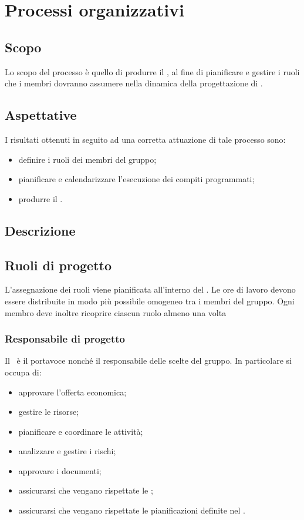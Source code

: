 \documentclass[../NormeDiProgetto.tex]{subfiles}
\begin{document}
	\section{Processi organizzativi}
		\subsection{Scopo}
			Lo scopo del processo è quello di produrre il \pianodiprogettoRR, al fine di pianificare e gestire i ruoli che i membri dovranno assumere nella dinamica della progettazione di \progetto.
		\subsection{Aspettative}
			I risultati ottenuti in seguito ad una corretta attuazione di tale processo sono:
			\begin{itemize}
				\item definire i ruoli dei membri del gruppo;
				\item pianificare e calendarizzare l'esecuzione dei compiti programmati;
				\item produrre il \pianodiprogetto.
			\end{itemize}				
		\subsection{Descrizione}
		\subsection{Ruoli di progetto}
			L'assegnazione dei ruoli viene pianificata all'interno del \pianodiprogetto. Le ore di lavoro devono essere distribuite in modo più possibile omogeneo tra i membri del gruppo. Ogni membro deve inoltre ricoprire ciascun ruolo almeno una volta
			\subsubsection{Responsabile di progetto}
				Il \responsabilediprogetto\ è il portavoce nonché il responsabile delle scelte del gruppo.
				In particolare si occupa di:
				\begin{itemize}
					\item approvare l'offerta economica;
					\item gestire le risorse;
					\item pianificare e coordinare le attività;
					\item analizzare e gestire i rischi;	
					\item approvare i documenti;
					\item assicurarsi che vengano rispettate le \normediprogetto;
					\item assicurarsi che vengano rispettate le pianificazioni definite nel \pianodiprogetto .
				\end{itemize}
\end{document}
